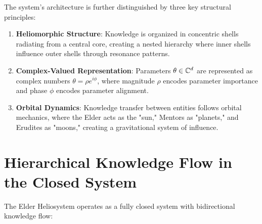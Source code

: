 The system's architecture is further distinguished by three key structural principles:

\begin{enumerate}
    \item \textbf{Heliomorphic Structure}: Knowledge is organized in concentric shells radiating from a central core, creating a nested hierarchy where inner shells influence outer shells through resonance patterns.
    
    \item \textbf{Complex-Valued Representation}: Parameters $\theta \in \mathbb{C}^{d}$ are represented as complex numbers $\theta = \rho e^{i\phi}$, where magnitude $\rho$ encodes parameter importance and phase $\phi$ encodes parameter alignment.
    
    \item \textbf{Orbital Dynamics}: Knowledge transfer between entities follows orbital mechanics, where the Elder acts as the "sun," Mentors as "planets," and Erudites as "moons," creating a gravitational system of influence.
\end{enumerate}

\section{Hierarchical Knowledge Flow in the Closed System}

The Elder Heliosystem operates as a fully closed system with bidirectional knowledge flow:

